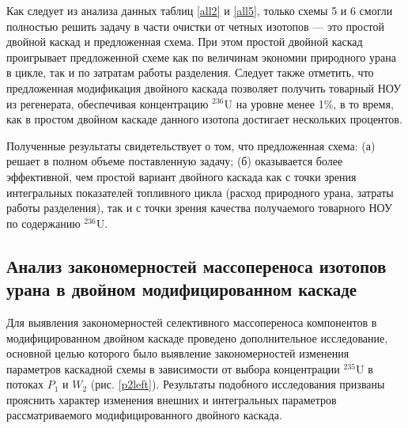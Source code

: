 \newpage

Как следует из анализа данных таблиц \ref{all2} и \ref{all5}, только схемы 5 и 6 смогли полностью решить задачу в части очистки от четных изотопов --- это простой двойной каскад и предложенная схема. При этом простой двойной каскад проигрывает предложенной схеме как по величинам экономии природного урана в цикле, так и по затратам работы разделения. Следует также отметить, что предложенная модификация двойного каскада позволяет получить товарный НОУ из регенерата, обеспечивая концентрацию $^{236}$U на уровне менее 1\%, в то время, как в простом двойном каскаде данного изотопа достигает нескольких процентов. 

Полученные результаты свидетельствует о том, что предложенная схема: (а) решает в полном объеме поставленную задачу; (б) оказывается более эффективной, чем простой вариант двойного каскада как с точки зрения интегральных показателей топливного цикла (расход природного урана, затраты работы разделения), так и с точки зрения качества получаемого товарного НОУ по содержанию $^{236}$U.

\subsection{Анализ закономерностей массопереноса изотопов урана в двойном модифицированном каскаде}

Для выявления закономерностей селективного массопереноса компонентов в модифицированном двойном каскаде  проведено дополнительное исследование, основной целью которого было выявление закономерностей изменения параметров каскадной схемы в зависимости от выбора концентрации $^{235}$U в потоках $P_1$ и $W_2$ (рис. \ref{p2left}). Результаты подобного исследования призваны прояснить характер изменения внешних и интегральных параметров рассматриваемого модифицированного двойного каскада.

